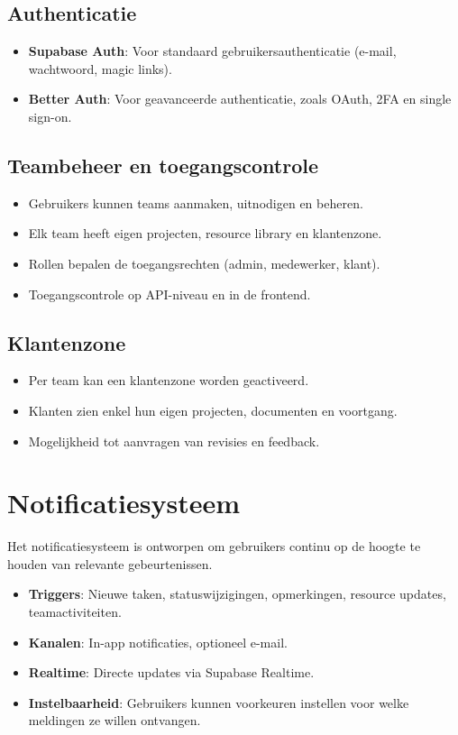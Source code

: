 \subsection{Authenticatie}
\begin{itemize}
    \item \textbf{Supabase Auth}: Voor standaard gebruikersauthenticatie (e-mail, wachtwoord, magic links).
    \item \textbf{Better Auth}: Voor geavanceerde authenticatie, zoals OAuth, 2FA en single sign-on.
\end{itemize}

\subsection{Teambeheer en toegangscontrole}
\begin{itemize}
    \item Gebruikers kunnen teams aanmaken, uitnodigen en beheren.
    \item Elk team heeft eigen projecten, resource library en klantenzone.
    \item Rollen bepalen de toegangsrechten (admin, medewerker, klant).
    \item Toegangscontrole op API-niveau en in de frontend.
\end{itemize}

\subsection{Klantenzone}
\begin{itemize}
    \item Per team kan een klantenzone worden geactiveerd.
    \item Klanten zien enkel hun eigen projecten, documenten en voortgang.
    \item Mogelijkheid tot aanvragen van revisies en feedback.
\end{itemize}

\section{Notificatiesysteem}
\label{sec:notificaties}

Het notificatiesysteem is ontworpen om gebruikers continu op de hoogte te houden van relevante gebeurtenissen.

\begin{itemize}
    \item \textbf{Triggers}: Nieuwe taken, statuswijzigingen, opmerkingen, resource updates, teamactiviteiten.
    \item \textbf{Kanalen}: In-app notificaties, optioneel e-mail.
    \item \textbf{Realtime}: Directe updates via Supabase Realtime.
    \item \textbf{Instelbaarheid}: Gebruikers kunnen voorkeuren instellen voor welke meldingen ze willen ontvangen.
\end{itemize}

